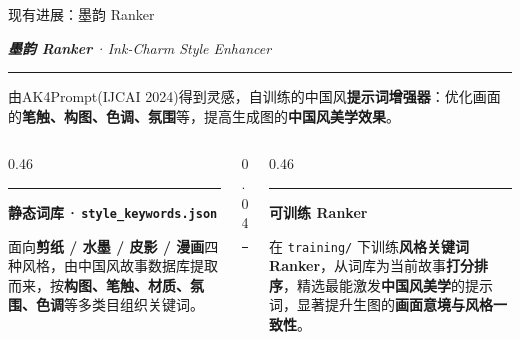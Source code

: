 \documentclass{beamer}
\newcommand{\kw}[1]{\textcolor{importantred}{\textbf{#1}}}
\newcommand{\goldrule}{\par\vspace{3pt}\noindent\textcolor{accentgold!60}{\rule{\linewidth}{0.4pt}}\par\vspace{3pt}}
\newcommand{\sidehead}[2][buptred]{%
  {\color{#1}\rule[-0.15em]{2.5pt}{1.0em}}\hspace{0.45em}\textbf{\small\color{darkred}#2}\par
  \vspace{2pt}%
}
\newcommand{\heroLG}[1]{%
  {\centering\color{darkred}\itshape\normalsize #1\par}%
}
\begin{document}
\begin{frame}[t]{现有进展：墨韵 Ranker}
    \vspace{0.05cm}
    \heroLG{\textbf{墨韵 Ranker}\,·\,Ink-Charm Style Enhancer}
    \goldrule\vspace{0.1cm}

    \footnotesize
    由AK4Prompt(IJCAI 2024)得到灵感，自训练的中国风\textbf{提示词增强器}：优化画面的\kw{笔触、构图、色调、氛围}等，提高生成图的\kw{中国风美学效果}。

    \vspace{0.45cm}
    \begin{columns}[T, onlytextwidth]
        \begin{column}[T]{0.46\linewidth}
            \sidehead{静态词库\,·\,\texttt{style\_keywords.json}}
            \scriptsize
            面向\kw{剪纸 / 水墨 / 皮影 / 漫画}四种风格，由中国风故事数据库提取而来，按\textbf{构图、笔触、材质、氛围、色调}等多类目组织关键词。
        \end{column}
        \begin{column}[T]{0.04\linewidth}
            \centering\textcolor{accentgold!60}{\rule{0.4pt}{3.6em}}
        \end{column}
        \begin{column}[T]{0.46\linewidth}
            \sidehead[accentgold]{可训练 Ranker}
            \scriptsize
            在 \texttt{training/} 下训练\kw{风格关键词 Ranker}，从词库为当前故事\textbf{打分排序}，精选最能激发\kw{中国风美学}的提示词，显著提升生图的\textbf{画面意境与风格一致性}。
        \end{column}
    \end{columns}
\end{frame}
\end{document}
